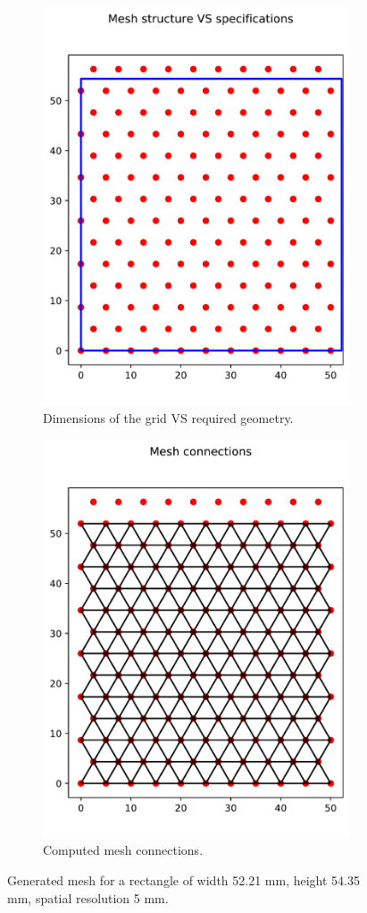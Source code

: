 \documentclass{article}
\begin{document}
\begin{figure}
    \centering
    \begin{subfigure}{.5\textwidth}
      \centering
      \includegraphics[width=.6\linewidth]{fig/meshsquare}
      \caption{Dimensions of the grid VS required geometry.}
      \label{fig:meshsquare}
    \end{subfigure}%
    \begin{subfigure}{.5\textwidth}
      \centering
      \includegraphics[width=.6\linewidth]{fig/meshgrid}
      \caption{Computed mesh connections.}
      \label{fig:meshgrid}
    \end{subfigure}
    \caption{Generated mesh for a rectangle of
    width 52.21 mm, height 54.35 mm, spatial resolution 5 mm.}
    \label{fig:jupytermesh}
\end{figure}
    
\end{document}
